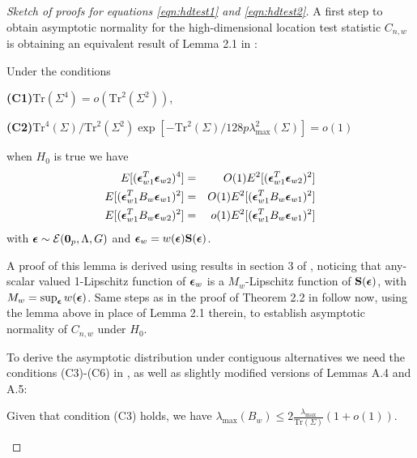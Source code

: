 \documentclass[fleqn,11pt]{article}
\begin{document}
\begin{proof}[Sketch of proofs for equations \ref{eqn:hdtest1} and \ref{eqn:hdtest2}]

A first step to obtain asymptotic normality for the high-dimensional location test statistic $C_{n,w}$ is obtaining an equivalent result of Lemma 2.1 in \cite{WangPengLi15}:

\begin{Lemma}\label{Lemma:HDlemma21} Under the conditions

\noindent\textbf{(C1)}$\text{Tr}(\Sigma^4) = o(\text{Tr}^2(\Sigma^2)) $,

\noindent\textbf{(C2)}$\text{Tr}^4(\Sigma) / \text{Tr}^2(\Sigma^2) \exp[ - \text{Tr}^2(\Sigma) / 128p \lambda^2_{\max}(\Sigma) ] = o(1)$
\vspace{1em}

\noindent when $H_0$ is true we have
%
\begin{eqnarray}
E[ ({\boldsymbol{\epsilon}}_{w1}^T {\boldsymbol{\epsilon}}_{w2})^4 ] &=& O(1) E^2[ ({\boldsymbol{\epsilon}}_{w1}^T {\boldsymbol{\epsilon}}_{w2})^2 ]\\
E[ ({\boldsymbol{\epsilon}}_{w1}^T B_w {\boldsymbol{\epsilon}}_{w1})^2 ] &=& O(1) E^2[ ({\boldsymbol{\epsilon}}_{w1}^T B_w {\boldsymbol{\epsilon}}_{w1})^2 ]\\
E[ ({\boldsymbol{\epsilon}}_{w1}^T B_w {\boldsymbol{\epsilon}}_{w2})^2 ] &=& o(1) E^2[ ({\boldsymbol{\epsilon}}_{w1}^T B_w {\boldsymbol{\epsilon}}_{w1})^2 ]
\end{eqnarray}
%
with ${\boldsymbol{\epsilon}} \sim \mathcal E({\bf 0}_p, \Lambda, G)$ and ${\boldsymbol{\epsilon}}_w = w({\boldsymbol{\epsilon}}) {\mathbf{S}}({\boldsymbol{\epsilon}})$.
\end{Lemma}
%
A proof of this lemma is derived using results in section 3 of \cite{ElKaroui09}, noticing that any-scalar valued 1-Lipschitz function of ${\boldsymbol{\epsilon}}_w$ is a $M_w$-Lipschitz function of ${\mathbf{S}}({\boldsymbol{\epsilon}})$, with $M_w = \sup_{\boldsymbol{\epsilon}} w({\boldsymbol{\epsilon}})$. Same steps as in the proof of Theorem 2.2 in \cite{WangPengLi15} follow now, using the lemma above in place of Lemma 2.1 therein, to establish asymptotic normality of $C_{n,w}$ under $H_0$.

To derive the asymptotic distribution under contiguous alternatives we need the conditions (C3)-(C6) in \cite{WangPengLi15}, as well as slightly modified versions of Lemmas A.4 and A.5:

\begin{Lemma}
Given that condition (C3) holds, we have $\lambda_{\max} (B_w) \leq 2 \frac{\lambda_{\max}}{\text{Tr} (\Sigma)} (1+o(1))$.
\end{Lemma}


\end{proof}
\end{document}
